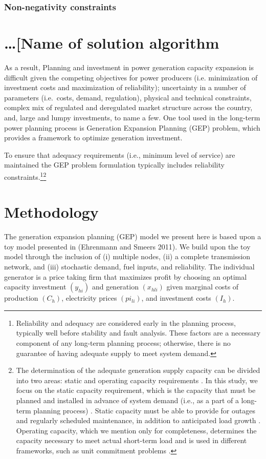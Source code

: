 \documentclass[10pt]{amsart}
\begin{document}
\subsubsection{Non-negativity constraints \nopunct}

\section{\ldots [Name of solution algorithm}


As a result, 
Planning and investment in power generation capacity expansion is difficult given the competing objectives for power producers (i.e. minimization of investment costs and maximization of reliability); uncertainty in a number of parameters (i.e.\ costs, demand, regulation), physical and technical constraints, complex mix of regulated and deregulated market structure across the country, and, large and lumpy investments, to name a few. 
One tool used in the long-term power planning process is Generation Expansion Planning (GEP) problem, which provides a framework to optimize generation investment.
	

To ensure that adequacy requirements (i.e., minimum level of service) are maintained the GEP problem formulation typically includes reliability constraints.\footnote{Reliability and adequacy are considered early in the planning process, typically well before stability and fault analysis. These factors are a necessary component of any long-term planning process; otherwise, there is no guarantee of having adequate supply to meet system demand.}\footnote{The determination of the adequate generation supply capacity can be divided into two areas: static and operating capacity requirements \parencite{billinton1984reliability}.
In this study, we focus on the static capacity requirement, which is the capacity that must be planned and installed in advance of system demand (i.e., as a part of a long-term planning process) \parencite{billinton1984reliability}.
Static capacity must be able to provide for outages and regularly scheduled maintenance, in addition to anticipated load growth \parencite{billinton1984reliability}.
Operating capacity, which we mention only for completeness, determines the capacity necessary to meet actual short-term load and is used in different frameworks, such as unit commitment problems \parencite{billinton1984reliability}.}
	 



\section{Methodology}
The generation expansion planning (GEP) model we present here is based upon a toy model presented in (Ehrenmann and Smeers 2011). We build upon the toy model through the inclusion of (i) multiple nodes, (ii) a complete transmission network, and (iii) stochastic demand, fuel inputs, and reliability. 
The individual generator is a price taking firm that maximizes profit by choosing an optimal capacity investment $(y_{hi})$ and generation $(x_{hli})$ given marginal costs of production $(C_h)$, electricity prices $(pi_{li})$, and investment costs $(I_{h})$.
\end{document}
